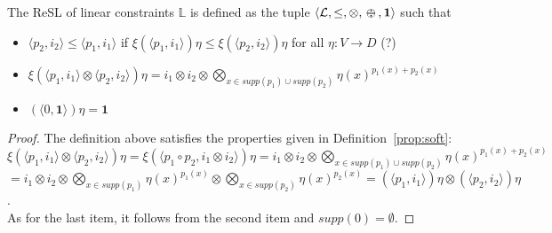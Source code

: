 \documentclass{llncs}
\def\monid{{\mathbf 0}}
\def\monop{\otimes}
\def\odiv{\, {\ominus\hspace{-7.7pt} \div} \,}
\def\monid{\mathbf{1}}
\begin{document}
\begin{lemma}\label{prop:soft}
	The ReSL of linear constraints $\mathbb{L}$ is
	defined as the tuple $\langle \mathcal{L}, \leq, \monop, \odiv, \monid \rangle$ such that
	
	\begin{itemize}
		\item $\langle p_2, i_2 \rangle \leq \langle p_1, i_1 \rangle$ if $\xi(\langle p_1, i_1 \rangle)\eta \leq \xi(\langle p_2, i_2 \rangle)\eta$ for all $\eta: V \rightarrow D$ (?)
		\item $\xi(\langle p_1, i_1 \rangle \monop \langle p_2, i_2 \rangle)\eta = i_1 \otimes i_2 \otimes \bigotimes_{x \in supp(p_1) \cup supp(p_2)} \eta(x)^{p_1(x) + p_2(x)}$
		\item $(\langle 0, \monid \rangle) \eta = \monid$
	\end{itemize}
\end{lemma}

\begin{proof}
    The definition above satisfies the properties given in Definition~\ref{prop:soft}: \\
    $\xi (\langle p_1, i_1 \rangle \monop \langle p_2, i_2 \rangle)\eta = \xi (\langle p_1 \circ p_2, i_1 \otimes i_2 \rangle)\eta = i_1 \otimes i_2 \otimes \bigotimes_{x \in supp(p_1) \cup supp(p_2)} \eta(x)^{p_1(x) + p_2(x)}$ \\ $= i_1 \otimes i_2 \otimes \bigotimes_{x \in supp(p_1)} \eta(x)^{p_1(x)} \otimes \bigotimes_{x \in supp(p_2)} \eta(x)^{p_2(x)} = (\langle p_1, i_1 \rangle)\eta \monop (\langle p_2, i_2 \rangle)\eta$. \\
    As for the last item, it follows from the second item and $supp(0) = \emptyset$.
\end{proof}
\end{document}
